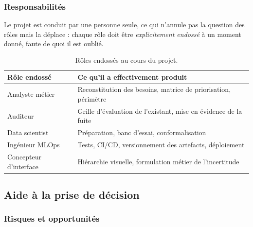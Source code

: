 \subsubsection*{Responsabilités}

Le projet est conduit par une personne seule, ce qui n'annule pas la question des
rôles mais la déplace : chaque rôle doit être \emph{explicitement endossé} à un
moment donné, faute de quoi il est oublié.

\begin{table}[H]
\centering
\small
\begin{tabularx}{\linewidth}{@{}L{3.4cm}X@{}}
\toprule
\textbf{Rôle endossé} & \textbf{Ce qu'il a effectivement produit} \\
\midrule
Analyste métier & Reconstitution des besoins, matrice de priorisation, périmètre \\
Auditeur & Grille d'évaluation de l'existant, mise en évidence de la fuite \\
Data scientist & Préparation, banc d'essai, conformalisation \\
Ingénieur MLOps & Tests, CI/CD, versionnement des artefacts, déploiement \\
Concepteur d'interface & Hiérarchie visuelle, formulation métier de l'incertitude \\
\bottomrule
\end{tabularx}
\caption{Rôles endossés au cours du projet.}
\end{table}

\subsection{Aide à la prise de décision}

\subsubsection*{Risques et opportunités}

